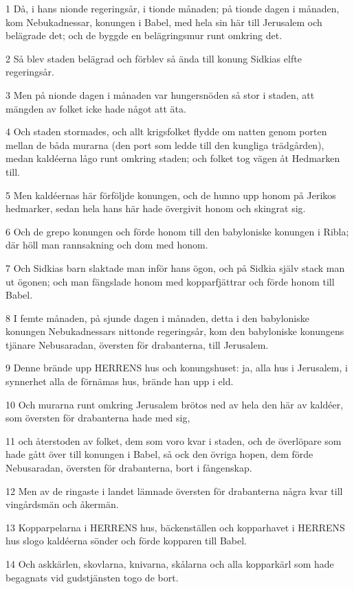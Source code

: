 \par 1 Då, i hans nionde regeringsår, i tionde månaden; på tionde dagen i månaden, kom Nebukadnessar, konungen i Babel, med hela sin här till Jerusalem och belägrade det; och de byggde en belägringsmur runt omkring det.
\par 2 Så blev staden belägrad och förblev så ända till konung Sidkias elfte regeringsår.
\par 3 Men på nionde dagen i månaden var hungersnöden så stor i staden, att mängden av folket icke hade något att äta.
\par 4 Och staden stormades, och allt krigsfolket flydde om natten genom porten mellan de båda murarna (den port som ledde till den kungliga trädgården), medan kaldéerna lågo runt omkring staden; och folket tog vägen åt Hedmarken till.
\par 5 Men kaldéernas här förföljde konungen, och de hunno upp honom på Jerikos hedmarker, sedan hela hans här hade övergivit honom och skingrat sig.
\par 6 Och de grepo konungen och förde honom till den babyloniske konungen i Ribla; där höll man rannsakning och dom med honom.
\par 7 Och Sidkias barn slaktade man inför hans ögon, och på Sidkia själv stack man ut ögonen; och man fängslade honom med kopparfjättrar och förde honom till Babel.
\par 8 I femte månaden, på sjunde dagen i månaden, detta i den babyloniske konungen Nebukadnessars nittonde regeringsår, kom den babyloniske konungens tjänare Nebusaradan, översten för drabanterna, till Jerusalem.
\par 9 Denne brände upp HERRENS hus och konungshuset: ja, alla hus i Jerusalem, i synnerhet alla de förnämas hus, brände han upp i eld.
\par 10 Och murarna runt omkring Jerusalem brötos ned av hela den här av kaldéer, som översten för drabanterna hade med sig,
\par 11 och återstoden av folket, dem som voro kvar i staden, och de överlöpare som hade gått över till konungen i Babel, så ock den övriga hopen, dem förde Nebusaradan, översten för drabanterna, bort i fångenskap.
\par 12 Men av de ringaste i landet lämnade översten för drabanterna några kvar till vingårdsmän och åkermän.
\par 13 Kopparpelarna i HERRENS hus, bäckenställen och kopparhavet i HERRENS hus slogo kaldéerna sönder och förde kopparen till Babel.
\par 14 Och askkärlen, skovlarna, knivarna, skålarna och alla kopparkärl som hade begagnats vid gudstjänsten togo de bort.
